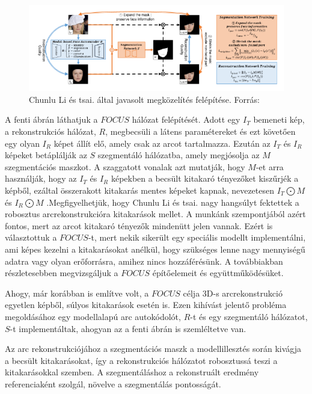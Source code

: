 \documentclass[12pt,a4]{article}
\begin{document}
            \begin{figure}[h]	
     		 \centering
     		 \includegraphics[width=1\linewidth]{focus}
     		 \caption{Chunlu Li és tsai. által javasolt megközelítés felépítése.
     			    Forrás:\cite{focus}}
                    \label{fig:focus}
     	      \end{figure}

            A fenti ábrán láthatjuk a $FOCUS$ hálózat felépítését.
            Adott egy $I_{T}$ bemeneti kép, a rekonstrukciós hálózat, $R$, megbecsüli a látens
     	      paramétereket és ezt követően egy olyan $I_{R}$ képet állít elő, amely csak az
     	      arcot tartalmazza. Ezután az $I_{T}$ és $I_{R}$ képeket betáplálják az 
            $S$ szegmentáló hálózatba, amely megjósolja az $M$ szegmentációs maszkot. A szaggatott vonalak azt mutatják, hogy $M$-et arra használják, hogy az $I_{T}$ és $I_{R}$ képekben a becsült kitakaró tényezőket kiszűrjék a képből, ezáltal összerakott kitakarás mentes képeket kapnak, nevezetesen $I_{T}\bigodot M$ és $I_{R}\bigodot M$ .Megfigyelhetjük, hogy Chunlu Li és tsai. nagy hangsúlyt fektettek a robosztus arcrekonstrukcióra kitakarások mellet. A munkánk szempontjából
     	      azért fontos, mert az arcot kitakaró tényezők mindenütt jelen vannak. 
            Ezért is választottuk a $FOCUS$-t, mert nekik sikerült egy speciális modellt implementálni, ami képes kezelni a kitakarásokat anélkül, hogy szükséges lenne nagy mennyiségű adatra vagy olyan erőforrásra, amihez nincs hozzáférésünk.
     	      A továbbiakban részletesebben megvizsgáljuk a $FOCUS$ építőelemeit és
     	      együttműködésüket.

            Ahogy, már korábban is említve volt, a $FOCUS$ célja 3D-s
     	      arcrekonstrukció egyetlen képből, súlyos kitakarások esetén is. Ezen kihívást
     	      jelentő probléma megoldásához egy modellalapú arc autokódolót, $R$-t és
     	      egy szegmentáló hálózatot, $S$-t implementáltak, ahogyan az a fenti ábrán is
     	      szemléltetve van.
    
            Az arc rekonstrukciójához a szegmentációs maszk a modellillesztés során
     	      kivágja a becsült kitakarásokat, így a rekonstrukciós hálózatot robosztussá
     	      teszi a kitakarásokkal szemben. A szegmentáláshoz a rekonstruált eredmény
     	      referenciaként szolgál, növelve a szegmentálás pontosságát.
    
\end{document}
